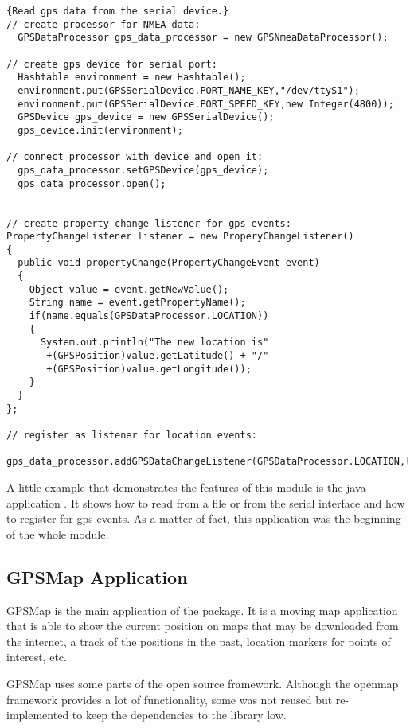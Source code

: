 \documentclass[a4paper]{article} %
\begin{document}
\begin{lstlisting}{Read gps data from the serial device.}
// create processor for NMEA data:
  GPSDataProcessor gps_data_processor = new GPSNmeaDataProcessor();

// create gps device for serial port:
  Hashtable environment = new Hashtable();
  environment.put(GPSSerialDevice.PORT_NAME_KEY,"/dev/ttyS1");
  environment.put(GPSSerialDevice.PORT_SPEED_KEY,new Integer(4800));
  GPSDevice gps_device = new GPSSerialDevice();
  gps_device.init(environment);

// connect processor with device and open it:
  gps_data_processor.setGPSDevice(gps_device);
  gps_data_processor.open();


// create property change listener for gps events:
PropertyChangeListener listener = new ProperyChangeListener()
{
  public void propertyChange(PropertyChangeEvent event)
  {
    Object value = event.getNewValue();
    String name = event.getPropertyName();
    if(name.equals(GPSDataProcessor.LOCATION))
    { 
      System.out.println("The new location is"
       +(GPSPosition)value.getLatitude() + "/"
       +(GPSPosition)value.getLongitude());
    }
  }
};

// register as listener for location events:
	gps_data_processor.addGPSDataChangeListener(GPSDataProcessor.LOCATION,listener);
\end{lstlisting}

A little example that demonstrates the features of this module is the
java application
. It shows how to
read from a file or from the serial interface and how to register for
gps events. As a matter of fact, this application was the beginning of
the whole module.


\subsection{GPSMap Application}
\label{SoftwareDesignOfTheGpstoolPackage-GpsmapApplication}

GPSMap is the main application of the 
package. It is a moving map application that is able to show the
current position on maps that may be downloaded from the internet, a
track of the positions in the past, location markers for points of
interest, etc.

GPSMap uses some parts of the open source
 framework. Although the
openmap framework provides a lot of functionality, some was not reused
but re-implemented to keep the dependencies to the library low.
\end{document}
